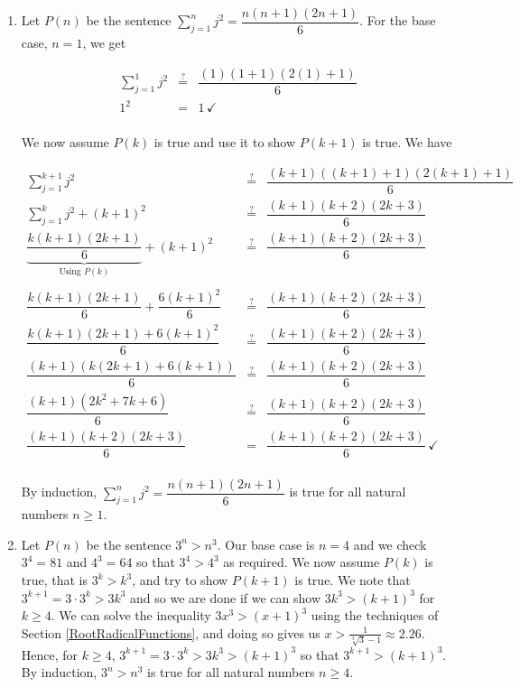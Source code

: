 \begin{enumerate}

\item  Let $P(n)$ be the sentence $\displaystyle{ \sum_{j=1}^{n} j^2 = \dfrac{n(n+1)(2n+1)}{6}}$. For the base case, $n=1$, we get

\[ \begin{array}{rcl} 

\displaystyle{ \sum_{j=1}^{1} j^2} & \stackrel{?}{=} &  \dfrac{(1)(1+1)(2(1)+1)}{6} \\ [15pt]
 1^2  & = & 1 \, \checkmark \\ \end{array} \]


We now assume $P(k)$ is true and use it to show $P(k+1)$ is true.  We have


\[ \begin{array}{rcl} 

\displaystyle{ \sum_{j=1}^{k+1} j^2} & \stackrel{?}{=} &  \dfrac{(k+1)((k+1)+1)(2(k+1)+1)}{6} \\ [15pt]
\displaystyle{ \sum_{j=1}^{k} j^2}  + (k+1)^2 &  \stackrel{?}{=}  & \dfrac{(k+1)(k+2)(2k+3)}{6} \\ [15pt]
\underbrace{\dfrac{k(k+1)(2k+1)}{6}}_{\text{Using $P(k)$}} + (k+1)^2 &  \stackrel{?}{=}  & \dfrac{(k+1)(k+2)(2k+3)}{6}  \\ 

&& \\

\dfrac{k(k+1)(2k+1)}{6} + \dfrac{6(k+1)^2}{6} &  \stackrel{?}{=}  & \dfrac{(k+1)(k+2)(2k+3)}{6}  \\ [10pt]
\dfrac{k(k+1)(2k+1)+6(k+1)^2}{6} &  \stackrel{?}{=}  & \dfrac{(k+1)(k+2)(2k+3)}{6}  \\ [10pt]
\dfrac{(k+1)(k(2k+1)+6(k+1))}{6} &  \stackrel{?}{=}  & \dfrac{(k+1)(k+2)(2k+3)}{6}  \\ [10pt]
\dfrac{(k+1)\left(2k^2+7k+6\right)}{6} &  \stackrel{?}{=}  & \dfrac{(k+1)(k+2)(2k+3)}{6}  \\ [10pt]
\dfrac{(k+1)(k+2)(2k+3)}{6} & = & \dfrac{(k+1)(k+2)(2k+3)}{6}  \, \checkmark \\ [10pt]
 \end{array} \]
 
 By induction, $\displaystyle{ \sum_{j=1}^{n} j^2 = \dfrac{n(n+1)(2n+1)}{6}}$ is true for all natural numbers $n \geq 1$.

\addtocounter{enumi}{2}

\item Let $P(n)$  be the sentence $3^n > n^3$.  Our base case is $n=4$ and we check $3^4 = 81$ and $4^3 = 64$ so that $3^4 > 4^3$ as required.  We now assume $P(k)$ is true, that is $3^k > k^3$, and try to show $P(k+1)$ is true.  We note that $3^{k+1} = 3 \cdot 3^{k} > 3k^3$ and so we are done if we can show $3k^3 > (k+1)^3$ for $k \geq 4$. We can solve the inequality $3x^3 > (x+1)^3$ using the techniques of Section \ref{RootRadicalFunctions}, and doing so gives us $x > \frac{1}{\sqrt[3]{3}-1} \approx 2.26.$  Hence, for $k \geq 4$, $3^{k+1} = 3 \cdot 3^{k} > 3k^3 > (k+1)^3$ so that $3^{k+1} > (k+1)^3$.   By induction, $3^n > n^3$ is true for all natural numbers $n \geq 4$.


\end{enumerate}
